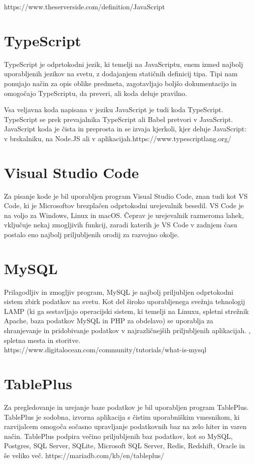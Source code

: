 \documentclass[a4paper, 12pt]{book}
\begin{document}
https://www.theserverside.com/definition/JavaScript

\section{TypeScript}
TypeScript je odprtokodni jezik, ki temelji na JavaScriptu, enem izmed najbolj uporabljenih jezikov na svetu, z dodajanjem statičnih definicij tipa. Tipi nam ponujajo način za opis oblike predmeta, zagotavljajo boljšo dokumentacijo in omogočajo TypeScriptu, da preveri, ali koda deluje pravilno.

Vsa veljavna koda napisana v jeziku JavaScript je tudi koda TypeScript. TypeScript se prek prevajalnika TypeScript ali Babel pretvori v JavaScript. JavaScript koda je čista in preprosta in se izvaja kjerkoli, kjer deluje JavaScript: v brskalniku, na Node.JS ali v aplikacijah.https://www.typescriptlang.org/

\section{Visual Studio Code}
Za pisanje kode je bil uporabljen program Visual Studio Code, znan tudi kot VS Code, ki je Microsoftov brezplačen odprtokodni urejevalnik besedil. VS Code je na voljo za Windows, Linux in macOS. Čeprav je urejevalnik razmeroma lahek, vključuje nekaj zmogljivih funkcij, zaradi katerih je VS Code v zadnjem času postalo eno najbolj priljubljenih orodij za razvojno okolje.

\section{MySQL}
Prilagodljiv in zmogljiv program, MySQL je najbolj priljubljen odprtokodni sistem zbirk podatkov na svetu. Kot del široko uporabljenega svežnja tehnologij LAMP (ki ga sestavljajo operacijski sistem, ki temelji na Linuxu, spletni strežnik Apache, baza podatkov MySQL in PHP za obdelavo) se uporablja za shranjevanje in pridobivanje podatkov v najrazličnejših priljubljenih aplikacijah. , spletna mesta in storitve.
https://www.digitalocean.com/community/tutorials/what-is-mysql

\section{TablePlus}
Za pregledovanje in urejanje baze podatkov je bil uporabljen program TablePlus. TablePlus je sodobna, izvorna aplikacija s čistim uporabniškim vmesnikom, ki razvijalcem omogoča sočasno upravljanje podatkovnih baz na zelo hiter in varen način. TablePlus podpira večino priljubljenih baz podatkov, kot so MySQL, Postgres, SQL Server, SQLite, Microsoft SQL Server, Redis, Redshift, Oracle in še veliko več.
https://mariadb.com/kb/en/tableplus/
\end{document}
